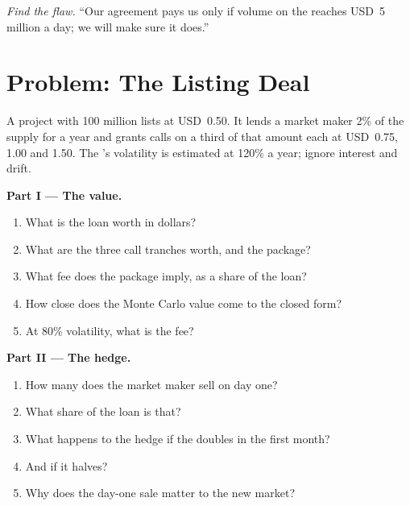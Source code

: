 \begin{exercise}[$\star\star\star$]\label{exo:m3:the-crypto-trading-business:8}
\emph{Find the flaw.} ``Our agreement pays us only if volume on the  reaches USD~5 million a day; we will make sure it does.''
\end{exercise}

\section{Problem: The Listing Deal}

\begin{problem}\label{pb:m3:the-crypto-trading-business:1}
A project with 100 million  lists at USD~0.50. It lends a market maker 2\% of the supply for a year and grants calls on a third of that amount each at
USD~0.75, 1.00 and 1.50. The 's volatility is estimated at 120\% a year; ignore interest and drift.

\medskip\noindent\textbf{Part I --- The value.}
\begin{enumerate}
\item What is the loan worth in dollars?
\item What are the three call tranches worth, and the package?
\item What fee does the package imply, as a share of the loan?
\item How close does the Monte Carlo value come to the closed form?
\item At 80\% volatility, what is the fee?
\end{enumerate}

\medskip\noindent\textbf{Part II --- The hedge.}
\begin{enumerate}[resume]
\item How many  does the market maker sell on day one?
\item What share of the loan is that?
\item What happens to the hedge if the  doubles in the first month?
\item And if it halves?
\item Why does the day-one sale matter to the new market?
\end{enumerate}


\end{problem}
